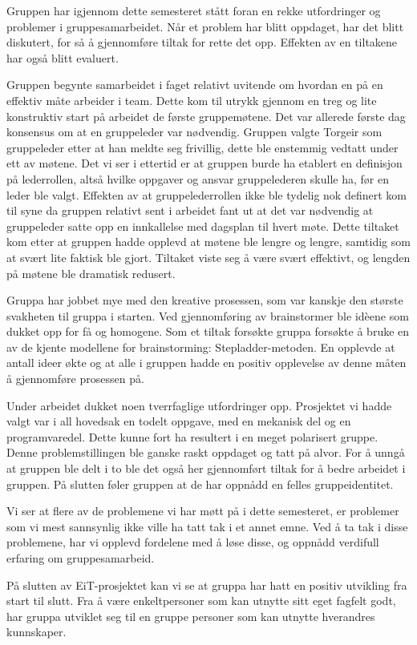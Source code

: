 Gruppen har igjennom dette semesteret stått foran en rekke utfordringer og problemer i gruppesamarbeidet.
Når et problem har blitt oppdaget, har det blitt diskutert, for så å gjennomføre tiltak for rette det opp.
Effekten av en tiltakene har også blitt evaluert.

Gruppen begynte samarbeidet i faget relativt uvitende om hvordan en på en effektiv måte arbeider i team.
Dette kom til utrykk gjennom en treg og lite konstruktiv start på arbeidet de første gruppemøtene.
Det var allerede første dag konsensus om at en gruppeleder var nødvendig.
Gruppen valgte Torgeir som gruppeleder etter at han meldte seg frivillig, dette ble enstemmig vedtatt under ett av møtene.
Det vi ser i ettertid er at gruppen burde ha etablert en definisjon på lederrollen, 
altså hvilke oppgaver og ansvar gruppelederen skulle ha, før en leder ble valgt.
Effekten av at gruppelederrollen ikke ble tydelig nok definert kom til syne da gruppen relativt sent i arbeidet fant ut at det var nødvendig at 
gruppeleder satte opp en innkallelse med dagsplan til hvert møte.
Dette tiltaket kom etter at gruppen hadde opplevd at møtene ble lengre og lengre, samtidig som at svært lite faktisk ble gjort.
Tiltaket viste seg å være svært effektivt, og lengden på møtene ble dramatisk redusert.

Gruppa har jobbet mye med den kreative prosessen, som var kanskje den største svakheten til gruppa i starten.
Ved gjennomføring av brainstormer ble idèene som dukket opp for få og homogene.
Som et tiltak forsøkte gruppa forsøkte å bruke en av de kjente modellene for brainstorming: Stepladder-metoden.
En opplevde at antall ideer økte og at alle i gruppen hadde en positiv opplevelse av denne måten å gjennomføre prosessen på.

Under arbeidet dukket noen tverrfaglige utfordringer opp.
Prosjektet vi hadde valgt var i all hovedsak en todelt oppgave, med en mekanisk del og en programvaredel.
Dette kunne fort ha resultert i en meget polarisert gruppe.
Denne problemstillingen ble ganske raskt oppdaget og tatt på alvor.
For å unngå at gruppen ble delt i to ble det også her gjennomført tiltak for å bedre arbeidet i gruppen.
På slutten føler gruppen at de har oppnådd en felles gruppeidentitet.

Vi ser at flere av de problemene vi har møtt på i dette semesteret,
er problemer som vi mest sannsynlig ikke ville ha tatt tak i et annet emne.
Ved å ta tak i disse problemene, har vi opplevd fordelene med å løse disse,
og oppnådd verdifull erfaring om gruppesamarbeid.

På slutten av EiT-prosjektet kan vi se at gruppa har hatt en positiv utvikling fra start til slutt.
Fra å være enkeltpersoner som kan utnytte sitt eget fagfelt godt,
har gruppa utviklet seg til en gruppe personer som kan utnytte hverandres kunnskaper.
